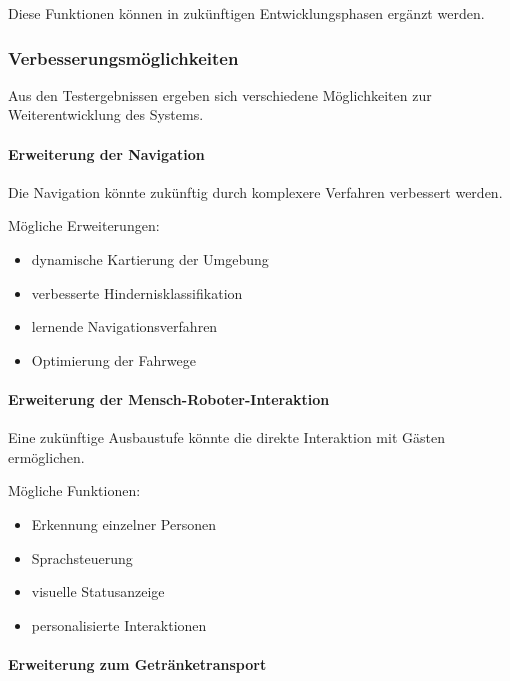 Diese Funktionen können in zukünftigen Entwicklungsphasen ergänzt
werden.

\subsubsection{Verbesserungsmöglichkeiten}\label{verbesserungsmuxf6glichkeiten}

Aus den Testergebnissen ergeben sich verschiedene Möglichkeiten zur
Weiterentwicklung des Systems.

\paragraph{Erweiterung der Navigation}\label{erweiterung-der-navigation}

Die Navigation könnte zukünftig durch komplexere Verfahren verbessert
werden.

Mögliche Erweiterungen:

\begin{itemize}
\tightlist
\item
  dynamische Kartierung der Umgebung
\item
  verbesserte Hindernisklassifikation
\item
  lernende Navigationsverfahren
\item
  Optimierung der Fahrwege
\end{itemize}

\paragraph{Erweiterung der
Mensch-Roboter-Interaktion}\label{erweiterung-der-mensch-roboter-interaktion}

Eine zukünftige Ausbaustufe könnte die direkte Interaktion mit Gästen
ermöglichen.

Mögliche Funktionen:

\begin{itemize}
\tightlist
\item
  Erkennung einzelner Personen
\item
  Sprachsteuerung
\item
  visuelle Statusanzeige
\item
  personalisierte Interaktionen
\end{itemize}

\paragraph{Erweiterung zum
Getränketransport}\label{erweiterung-zum-getruxe4nketransport}

